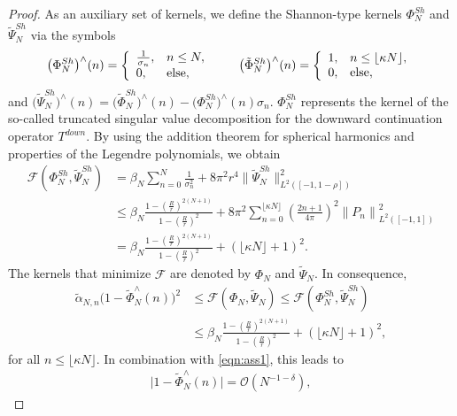 \documentclass[a4paper, 10pt]{article}
\numberwithin{equation}{section}
\theoremstyle{definition}
\begin{document}
\begin{proof}
As an auxiliary set of kernels, we define the Shannon-type kernels $\Phi_N^{Sh}$ and $\tilde{\Psi}_N^{Sh}$ via the symbols
\begin{align}
\big(\Phi_N^{Sh}\big)^\wedge(n)=\left\{\begin{array}{ll}\frac{1}{\sigma_n},&n\leq N,\\0,&\textnormal{else},\end{array}\right.\qquad \big(\tilde{\Phi}_{N}^{Sh}\big)^\wedge(n)=\left\{\begin{array}{ll}1,&n\leq \lfloor\kappa N\rfloor,\\0,&\textnormal{else},\end{array}\right.
\end{align}
and $\big(\tilde{\Psi}_N^{Sh}\big)^\wedge(n)=\big(\tilde{\Phi}_N^{Sh}\big)^\wedge(n)-\big(\Phi_N^{Sh}\big)^\wedge(n)\sigma_n$. $\Phi_N^{Sh}$ represents the kernel of the so-called truncated singular value decomposition for the downward continuation operator ${T}^{down}$. By using the addition theorem for spherical harmonics and properties of the Legendre polynomials, we obtain
\begin{align}
\mathcal{F}(\Phi_N^{Sh},\tilde{\Psi}_N^{Sh})&=\beta_N\sum_{n=0}^{N}\frac{1}{\sigma_n^2}+8\pi^2 r^4\big\|\tilde{\Psi}_N^{Sh}\big\|^2_{L^2([-1,1-\rho])}\label{eqn:shannonest}
\\&\leq \beta_N\frac{1-\left(\frac{R}{r}\right)^{2(N+1)}}{1-\left(\frac{R}{r}\right)^{2}}+8\pi^2\sum_{n=0}^{\lfloor\kappa N\rfloor}\left(\frac{2n+1}{4\pi}\right)^2\left\|P_n\right\|^2_{L^2([-1,1])}\nonumber
\\&= \beta_N\frac{1-\left(\frac{R}{r}\right)^{2(N+1)}}{1-\left(\frac{R}{r}\right)^{2}}+(\lfloor\kappa N\rfloor+1)^2.\nonumber
\end{align}
The kernels that minimize $\mathcal{F}$ are denoted by $\Phi_N$ and $\tilde{\Psi}_N$. In consequence,
\begin{align}
\tilde{\alpha}_{N,n}\big(1-\tilde{\Phi}_{N}^\wedge(n)\big)^2&\leq\mathcal{F}(\Phi_N,\tilde{\Psi}_N)\leq \mathcal{F}(\Phi_N^{Sh},\tilde{\Psi}_N^{Sh})
\\&\leq \beta_N\frac{1-\left(\frac{R}{r}\right)^{2(N+1)}}{1-\left(\frac{R}{r}\right)^{2}}+(\lfloor\kappa N\rfloor+1)^2,\nonumber
\end{align}
for all $n\leq \lfloor\kappa N\rfloor$. In combination with \eqref{eqn:ass1}, this leads to
\begin{align}\label{eqn:conphij}
\big|1-\tilde{\Phi}_{N}^\wedge(n)\big|= \mathcal{O}(N^{-1-\delta}),

\end{align}
\end{proof}
\end{document}
